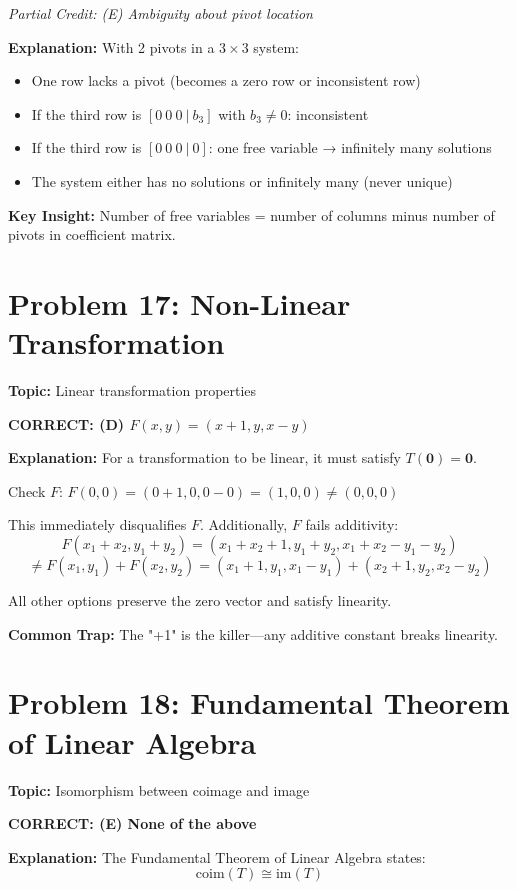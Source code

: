 \documentclass[12pt]{amsart}
\newcommand{\correct}[1]{{\color{blue}\textbf{CORRECT: #1}}}
\newcommand{\partcred}[1]{{\color{red}\textit{Partial Credit: #1}}}
\newcommand{\hint}{\textbf{Key Insight: }}
\newcommand{\trap}{\textbf{Common Trap: }}
\begin{document}
\partcred{(E) Ambiguity about pivot location}

\textbf{Explanation:} With 2 pivots in a $3 \times 3$ system:
\begin{itemize}
\item One row lacks a pivot (becomes a zero row or inconsistent row)
\item If the third row is $[0\ 0\ 0\ |\ b_3]$ with $b_3 \neq 0$: inconsistent
\item If the third row is $[0\ 0\ 0\ |\ 0]$: one free variable → infinitely many solutions
\item The system either has no solutions or infinitely many (never unique)
\end{itemize}

\hint Number of free variables = number of columns minus number of pivots in coefficient matrix.

\hrulefill

\section*{Problem 17: Non-Linear Transformation}
\textbf{Topic:} Linear transformation properties

\correct{(D) $F(x,y) = (x+1, y, x-y)$}

\textbf{Explanation:} For a transformation to be linear, it must satisfy $T(\mathbf{0}) = \mathbf{0}$.

Check $F$: $F(0,0) = (0+1, 0, 0-0) = (1, 0, 0) \neq (0, 0, 0)$

This immediately disqualifies $F$. Additionally, $F$ fails additivity:
$$F(x_1+x_2, y_1+y_2) = (x_1+x_2+1, y_1+y_2, x_1+x_2-y_1-y_2)$$
$$\neq F(x_1,y_1) + F(x_2,y_2) = (x_1+1, y_1, x_1-y_1) + (x_2+1, y_2, x_2-y_2)$$

All other options preserve the zero vector and satisfy linearity.

\trap The "+1" is the killer—any additive constant breaks linearity.

\hrulefill

\section*{Problem 18: Fundamental Theorem of Linear Algebra}
\textbf{Topic:} Isomorphism between coimage and image

\correct{(E) None of the above}

\textbf{Explanation:} The Fundamental Theorem of Linear Algebra states:
$$\text{coim}(T) \cong \text{im}(T)$$
\end{document}
